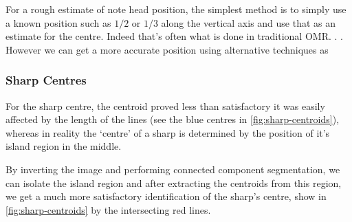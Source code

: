 For a rough estimate of note head position, the simplest method is to simply use a known position such as $1/2$ or $1/3$ along the vertical axis and use that as an estimate for the centre. Indeed that's often what is done in traditional OMR. . . However we can get a more accurate position using alternative techniques as 


\subsubsection{Sharp Centres}
For the sharp centre, the centroid proved less than satisfactory it was easily affected by the length of the lines (see the blue centres in \cref{fig:sharp-centroids}), whereas in reality the `centre' of a sharp is determined by the position of it's island region in the middle.

By inverting the image and performing connected component segmentation, we can isolate the island region and after extracting the centroids from this region, we get a much more satisfactory identification of the sharp's centre, show in \cref{fig:sharp-centroids} by the intersecting red lines.

